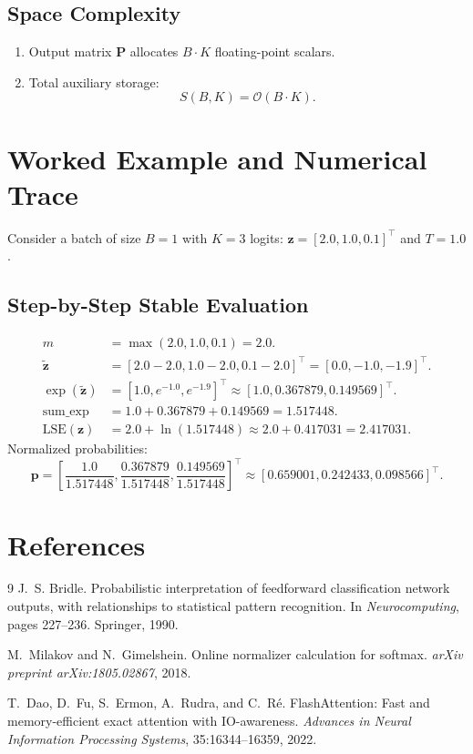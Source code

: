 \documentclass[11pt]{article}
\begin{document}
\subsection{Space Complexity}
\begin{enumerate}
    \item Output matrix $\mathbf{P}$ allocates $B \cdot K$ floating-point scalars.
    \item Total auxiliary storage:
    \begin{equation}
    S(B, K) = \mathcal{O}(B \cdot K).
    \end{equation}
\end{enumerate}

\section{Worked Example and Numerical Trace}
\label{sec:worked_example}

Consider a batch of size $B = 1$ with $K = 3$ logits: $\mathbf{z} = [2.0, 1.0, 0.1]^\top$ and $T = 1.0$.

\subsection{Step-by-Step Stable Evaluation}
\begin{align}
m &= \max(2.0, 1.0, 0.1) = 2.0. \\
\tilde{\mathbf{z}} &= [2.0 - 2.0, 1.0 - 2.0, 0.1 - 2.0]^\top = [0.0, -1.0, -1.9]^\top. \\
\exp(\tilde{\mathbf{z}}) &= [1.0, e^{-1.0}, e^{-1.9}]^\top \approx [1.0, 0.367879, 0.149569]^\top. \\
\text{sum\_exp} &= 1.0 + 0.367879 + 0.149569 = 1.517448. \\
\text{LSE}(\mathbf{z}) &= 2.0 + \ln(1.517448) \approx 2.0 + 0.417031 = 2.417031.
\end{align}
Normalized probabilities:
\begin{equation}
\mathbf{p} = \left[ \frac{1.0}{1.517448}, \frac{0.367879}{1.517448}, \frac{0.149569}{1.517448} \right]^\top \approx [0.659001, 0.242433, 0.098566]^\top.
\end{equation}

\section{References}
\label{sec:references}

\begin{thebibliography}{9}
J.~S. Bridle.
\newblock Probabilistic interpretation of feedforward classification network outputs, with relationships to statistical pattern recognition.
\newblock In \emph{Neurocomputing}, pages 227--236. Springer, 1990.

M.~Milakov and N.~Gimelshein.
\newblock Online normalizer calculation for softmax.
\newblock \emph{arXiv preprint arXiv:1805.02867}, 2018.

T.~Dao, D.~Fu, S.~Ermon, A.~Rudra, and C.~R{\'e}.
\newblock FlashAttention: Fast and memory-efficient exact attention with IO-awareness.
\newblock \emph{Advances in Neural Information Processing Systems}, 35:16344--16359, 2022.
\end{thebibliography}
\end{document}
